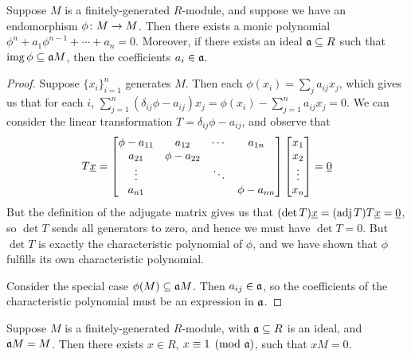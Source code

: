 \begin{lemma}\label{lem:cayley-hamilton}
    Suppose \(M\) is a finitely-generated \(R\)-module,
    and suppose we have an endomorphism \(\phi\colon M\to M\).
    Then there exists a monic polynomial \(\phi^n + a_1\phi^{n-1} + \cdots + a_n = 0\).
    Moreover, if there exists an ideal \(\mathfrak{a} \subseteq R\) such that \(\operatorname{img}\phi \subseteq \mathfrak{a}M\),
    then the coefficients \(a_i \in \mathfrak{a}\).
\end{lemma}
\begin{proof}
    Suppose \({\{x_i\}}_{i=1}^n\) generates \(M\).
    Then each \(\phi(x_i) = \sum_j a_{ij}x_j\),
    which gives us that for each \(i\),
    \(\sum_{j=1}^n (\delta_{ij}\phi - a_{ij})x_j = \phi(x_i) - \sum_{j=1}^n a_{ij}x_j = 0\).
    We can consider the linear transformation \(T = \delta_{ij}\phi - a_{ij}\),
    and observe that
    \begin{equation*}
        T\vec{x} =
        \begin{bmatrix}
            \phi-a_{11} & a_{12} & \cdots & a_{1n} \\
            a_{21} & \phi-a_{22} \\
            \vdots & & \ddots \\
            a_{n1} & & & \phi-a_{nn}
        \end{bmatrix}
        \bmqty{x_1 \\ x_2 \\ \vdots \\ x_n}
        = \vec{0}
    \end{equation*}
    But the definition of the adjugate matrix gives us that
    \((\det T)\underline{x} = (\operatorname{adj} T)T\underline{x} = \underline{0}\),
    so \(\det T\) sends all generators to zero,
    and hence we must have \(\det T = 0\).
    But \(\det T\) is exactly the characteristic polynomial of \(\phi\),
    and we have shown that \(\phi\) fulfills its own characteristic polynomial.

    Consider the special case \(\phi(M) \subseteq \mathfrak{a}M\).
    Then \(a_{ij} \in \mathfrak{a}\),
    so the coefficients of the characteristic polynomial
    must be an expression in \(\mathfrak{a}\).
\end{proof}
\begin{corollary}\label{cor:nakayama}
    Suppose \(M\) is a finitely-generated \(R\)-module,
    with \(\mathfrak{a} \subseteq R\) is an ideal, and \(\mathfrak{a}M = M\).
    Then there exists \(x \in R\), \(x \equiv 1\pmod{\mathfrak{a}}\), such that \(xM = 0\).
\end{corollary}
